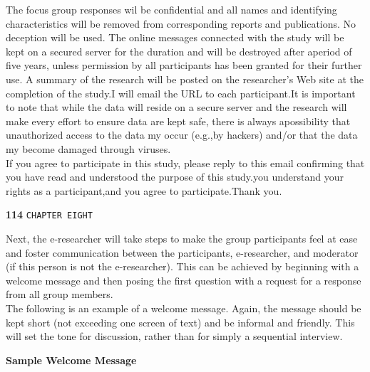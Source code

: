 \documentclass[a4]{book}
\begin{document}
\vspace*{0.4cm}
The focus group responses wil be confidential and all names and identifying characteristics will be removed from corresponding reports and publications. No deception will be used. The online messages connected with the study will be kept on a secured server for the duration and will be destroyed after aperiod of five years, unless permission by all participants has been granted for their further use.
 A summary of the research will be posted on the researcher's Web site at the completion of the study.I will email the URL to each participant.It is important to note that while the data will reside on a secure server and the research will make every effort to ensure data are kept safe, there is always apossibility that unauthorized access to the data my occur (e.g.,by hackers) and/or that the data my become damaged through viruses.\\

\vspace*{0.4cm}
If you agree to participate in this study, please reply to this email confirming that you have read and understood the purpose of this study.you understand your rights as a participant,and you agree to participate.Thank you. \\

\newpage
\begin{flushleft}
\hspace*{-0.5cm} \textbf{114}\hspace*{1cm} \texttt{CHAPTER EIGHT}
\end{flushleft}

\vspace*{0.5cm}
Next, the e-researcher will take steps to make the group participants feel at ease and foster communication between the participants, e-researcher, and moderator (if this person is not the e-researcher). This can be achieved by beginning with a welcome message and then posing the first question with a request for a response from all group members.\\
\hspace*{0.7cm} The following is an example of a welcome message. Again, the message should be kept short (not exceeding one screen of text) and be informal and friendly. This will set the tone for discussion, rather than for simply a sequential interview.\\

\vspace*{0.3cm}
\begin{center}
  \textbf{Sample Welcome Message}\\
\end{center}
\vspace*{0.3cm}
\end{document}
